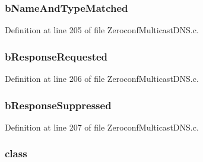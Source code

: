 \subsubsection[{b\+Name\+And\+Type\+Matched}]{ b\+Name\+And\+Type\+Matched}\label{struct__m_d_n_s_resource_record_a0c56094453067069894f36b474fe6937}


Definition at line 205 of file Zeroconf\+Multicast\+D\+N\+S.\+c.

\hypertarget{struct__m_d_n_s_resource_record_a20ac22a1e4fb67a4ae0b833549256a22}{}
\subsubsection[{b\+Response\+Requested}]{ b\+Response\+Requested}\label{struct__m_d_n_s_resource_record_a20ac22a1e4fb67a4ae0b833549256a22}


Definition at line 206 of file Zeroconf\+Multicast\+D\+N\+S.\+c.

\hypertarget{struct__m_d_n_s_resource_record_a6c797734e12d3891e823bc12596f9e77}{}
\subsubsection[{b\+Response\+Suppressed}]{ b\+Response\+Suppressed}\label{struct__m_d_n_s_resource_record_a6c797734e12d3891e823bc12596f9e77}


Definition at line 207 of file Zeroconf\+Multicast\+D\+N\+S.\+c.

\hypertarget{struct__m_d_n_s_resource_record_a6c250cf4ef59c5f2a8b194d6204ca214}{}
\subsubsection[{class}]{ class}\label{struct__m_d_n_s_resource_record_a6c250cf4ef59c5f2a8b194d6204ca214}


